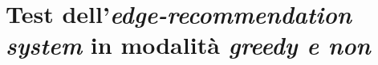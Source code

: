 \chapter{Test dell’\textit{edge-recommendation system} in modalità \textit{greedy e non}}
\label{chap:test}
\Blindtext
